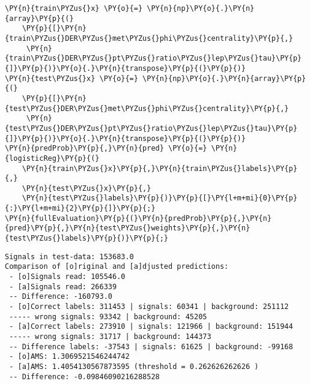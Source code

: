 {\par%
\vspace{-1\baselineskip}%
}%
\begin{notebookcell}[]%
\begin{addmargin}[\cellleftmargin]{0em}%
{\smaller%
\par%
%
\vspace{-1\smallerfontscale}%
\begin{Verbatim}[commandchars=\\\{\}]
\PY{n}{train\PYZus{}x} \PY{o}{=} \PY{n}{np}\PY{o}{.}\PY{n}{array}\PY{p}{(}
    \PY{p}{[}\PY{n}{train\PYZus{}DER\PYZus{}met\PYZus{}phi\PYZus{}centrality}\PY{p}{,}
     \PY{n}{train\PYZus{}DER\PYZus{}pt\PYZus{}ratio\PYZus{}lep\PYZus{}tau}\PY{p}{]}\PY{p}{)}\PY{o}{.}\PY{n}{transpose}\PY{p}{(}\PY{p}{)}
\PY{n}{test\PYZus{}x} \PY{o}{=} \PY{n}{np}\PY{o}{.}\PY{n}{array}\PY{p}{(}
    \PY{p}{[}\PY{n}{test\PYZus{}DER\PYZus{}met\PYZus{}phi\PYZus{}centrality}\PY{p}{,}
     \PY{n}{test\PYZus{}DER\PYZus{}pt\PYZus{}ratio\PYZus{}lep\PYZus{}tau}\PY{p}{]}\PY{p}{)}\PY{o}{.}\PY{n}{transpose}\PY{p}{(}\PY{p}{)}
\PY{n}{predProb}\PY{p}{,}\PY{n}{pred} \PY{o}{=} \PY{n}{logisticReg}\PY{p}{(}
    \PY{n}{train\PYZus{}x}\PY{p}{,}\PY{n}{train\PYZus{}labels}\PY{p}{,}
    \PY{n}{test\PYZus{}x}\PY{p}{,}
    \PY{n}{test\PYZus{}labels}\PY{p}{)}\PY{p}{[}\PY{l+m+mi}{0}\PY{p}{:}\PY{l+m+mi}{2}\PY{p}{]}\PY{p}{;}
\PY{n}{fullEvaluation}\PY{p}{(}\PY{n}{predProb}\PY{p}{,}\PY{n}{pred}\PY{p}{,}\PY{n}{test\PYZus{}weights}\PY{p}{,}\PY{n}{test\PYZus{}labels}\PY{p}{)}\PY{p}{;}
\end{Verbatim}
%
\par%
\vspace{-1\smallerfontscale}}%
\end{addmargin}
\end{notebookcell}

\par\vspace{1\smallerfontscale}%
    \begin{addmargin}[\cellleftmargin]{0em}%
    {\smaller%
    \vspace{-1\smallerfontscale}%
    
    \begin{Verbatim}[commandchars=\\\{\}]
Signals in test-data: 153683.0
Comparison of [o]riginal and [a]djusted predictions:
 - [o]Signals read: 105546.0 
 - [a]Signals read: 266339 
 -- Difference: -160793.0 
 - [o]Correct labels: 311453 | signals: 60341 | background: 251112 
 ----- wrong signals: 93342 | background: 45205 
 - [a]Correct labels: 273910 | signals: 121966 | background: 151944 
 ----- wrong signals: 31717 | background: 144373 
 -- Difference labels: -37543 | signals: 61625 | background: -99168 
 - [o]AMS: 1.3069521546244742 
 - [a]AMS: 1.4054130567873595 (threshold = 0.262626262626 )
 -- Difference: -0.09846090216288528
    \end{Verbatim}
}%
    \end{addmargin}%

    
    
    
